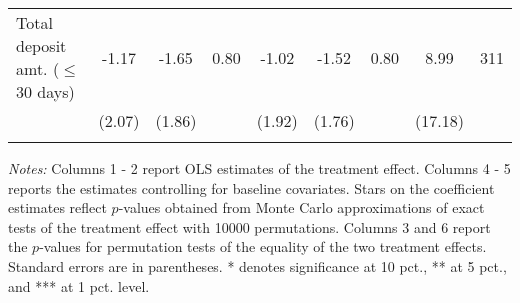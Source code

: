 \begin{table}[h]
{\begin{threeparttable}
\begin{tabular}{l*{8}{c}}
Total deposit amt. ($\leq$ 30 days)&    -1.17&    -1.65&     0.80&    -1.02&    -1.52&     0.80&     8.99&      311\\
          &   (2.07)&   (1.86)&         &   (1.92)&   (1.76)&         &  (17.18)&         \\
          &         &         &         &         &         &         &         &         \\
\bottomrule \end{tabular} \begin{tablenotes}[flushleft] \footnotesize \item \emph{Notes:} Columns 1 - 2 report OLS estimates of the treatment effect. Columns 4 - 5 reports the estimates controlling for baseline covariates. Stars on the coefficient estimates reflect \(p\)-values obtained from Monte Carlo approximations of exact tests of the treatment effect with 10000 permutations. Columns 3 and 6 report the \(p\)-values for permutation tests of the equality of the two treatment effects. Standard errors are in parentheses. * denotes significance at 10 pct., ** at 5 pct., and *** at 1 pct. level. \end{tablenotes} \end{threeparttable} } \end{table}

